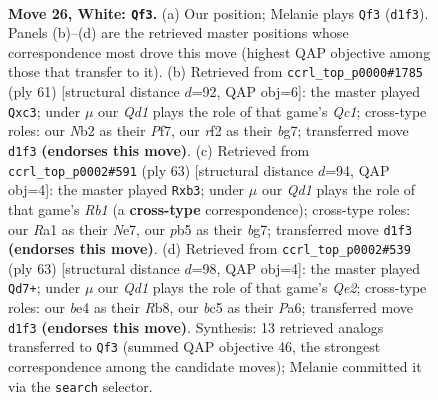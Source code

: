 \documentclass[11pt]{article}
\begin{document}
\clearpage

\begin{figure}[p]\centering
\begin{subfigure}{0.46\textwidth}\centering
\resizebox{\linewidth}{!}{%
\newchessgame
\chessboard[
  setfen={1n2k3/8/8/ppb2p2/4b3/8/PN3r2/R2Q1R1K w - - 0 26},
  showmover=false,
  pgfstyle=straightmove, color=movearrow, markmove={d1-f3}
]}
\caption{}
\end{subfigure}\hfill
\begin{subfigure}{0.46\textwidth}\centering
\resizebox{\linewidth}{!}{%
\newchessgame
\chessboard[
  setfen={2q2rk1/5pB1/3p4/3P4/4bR2/2Q3P1/7P/6K1 b - - 2 31},
  showmover=false,
  pgfstyle=straightmove, color=movearrow, markmove={c8-c3}
]}
\caption{}
\end{subfigure}
\\[4pt]
\begin{subfigure}{0.46\textwidth}\centering
\resizebox{\linewidth}{!}{%
\newchessgame
\chessboard[
  setfen={1r1r4/4n1Bp/3k4/2p5/2B5/1R4P1/P4P1P/6K1 b - - 4 32},
  showmover=false,
  pgfstyle=straightmove, color=movearrow, markmove={b8-b3}
]}
\caption{}
\end{subfigure}\hfill
\begin{subfigure}{0.46\textwidth}\centering
\resizebox{\linewidth}{!}{%
\newchessgame
\chessboard[
  setfen={1r4rk/4q2p/p7/3Pp3/4B3/4B2K/PP3P2/R2Q4 b - - 2 32},
  showmover=false,
  pgfstyle=straightmove, color=movearrow, markmove={e7-d7}
]}
\caption{}
\end{subfigure}
\caption{\textbf{Move 26, White: \texttt{Qf3}.} (a) Our position; Melanie plays \texttt{Qf3} (\texttt{d1f3}). Panels (b)--(d) are the retrieved master positions whose correspondence most drove this move (highest QAP objective among those that transfer to it). (b) Retrieved from \texttt{ccrl\_top\_p0000\#1785} (ply 61) [structural distance $d$=92, QAP obj=6]: the master played \texttt{Qxc3}; under $\mu$ our \emph{Qd1} plays the role of that game's \emph{Qc1}; cross-type roles: our \emph{N}b2 as their \emph{P}f7, our \emph{r}f2 as their \emph{b}g7; transferred move \texttt{d1f3} \textbf{(endorses this move)}. (c) Retrieved from \texttt{ccrl\_top\_p0002\#591} (ply 63) [structural distance $d$=94, QAP obj=4]: the master played \texttt{Rxb3}; under $\mu$ our \emph{Qd1} plays the role of that game's \emph{Rb1} (a \textbf{cross-type} correspondence); cross-type roles: our \emph{R}a1 as their \emph{N}e7, our \emph{p}b5 as their \emph{b}g7; transferred move \texttt{d1f3} \textbf{(endorses this move)}. (d) Retrieved from \texttt{ccrl\_top\_p0002\#539} (ply 63) [structural distance $d$=98, QAP obj=4]: the master played \texttt{Qd7+}; under $\mu$ our \emph{Qd1} plays the role of that game's \emph{Qe2}; cross-type roles: our \emph{b}e4 as their \emph{R}b8, our \emph{b}c5 as their \emph{P}a6; transferred move \texttt{d1f3} \textbf{(endorses this move)}. Synthesis: 13 retrieved analogs transferred to \texttt{Qf3} (summed QAP objective 46, the strongest correspondence among the candidate moves); Melanie committed it via the \texttt{search} selector.}
\label{fig:thought-m50}
\end{figure}
\end{document}
